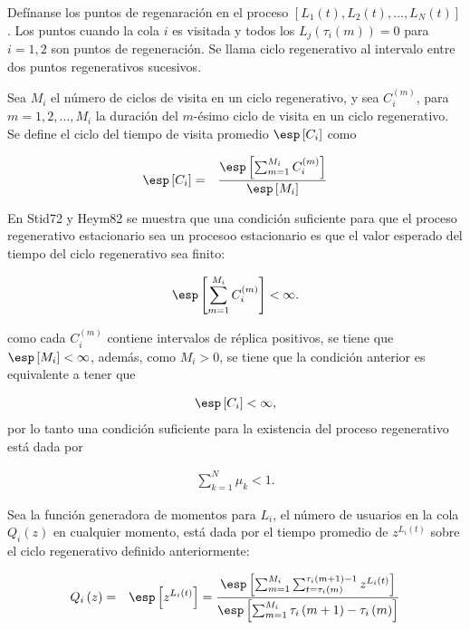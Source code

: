 Def\'inanse los puntos de regenaraci\'on  en el proceso $\left[L_{1}\left(t\right),L_{2}\left(t\right),\ldots,L_{N}\left(t\right)\right]$. Los puntos cuando la cola $i$ es visitada y todos los $L_{j}\left(\tau_{i}\left(m\right)\right)=0$ para $i=1,2$  son puntos de regeneraci\'on. Se llama ciclo regenerativo al intervalo entre dos puntos regenerativos sucesivos.

Sea $M_{i}$  el n\'umero de ciclos de visita en un ciclo regenerativo, y sea $C_{i}^{(m)}$, para $m=1,2,\ldots,M_{i}$ la duraci\'on del $m$-\'esimo ciclo de visita en un ciclo regenerativo. Se define el ciclo del tiempo de visita promedio $\esp\left[C_{i}\right]$ como

\begin{eqnarray*}
\esp\left[C_{i}\right]&=&\frac{\esp\left[\sum_{m=1}^{M_{i}}C_{i}^{(m)}\right]}{\esp\left[M_{i}\right]}
\end{eqnarray*}


En Stid72 y Heym82 se muestra que una condici\'on suficiente para que el proceso regenerativo 
estacionario sea un procesoo estacionario es que el valor esperado del tiempo del ciclo regenerativo sea finito:

\begin{eqnarray*}
\esp\left[\sum_{m=1}^{M_{i}}C_{i}^{(m)}\right]<\infty.
\end{eqnarray*}

como cada $C_{i}^{(m)}$ contiene intervalos de r\'eplica positivos, se tiene que $\esp\left[M_{i}\right]<\infty$, adem\'as, como $M_{i}>0$, se tiene que la condici\'on anterior es equivalente a tener que 

\begin{eqnarray*}
\esp\left[C_{i}\right]<\infty,
\end{eqnarray*}
por lo tanto una condici\'on suficiente para la existencia del proceso regenerativo est\'a dada por

\begin{eqnarray*}
\sum_{k=1}^{N}\mu_{k}<1.
\end{eqnarray*}

Sea la funci\'on generadora de momentos para $L_{i}$, el n\'umero de usuarios en la cola $Q_{i}\left(z\right)$ en cualquier momento, est\'a dada por el tiempo promedio de $z^{L_{i}\left(t\right)}$ sobre el ciclo regenerativo definido anteriormente:

\begin{eqnarray*}
Q_{i}\left(z\right)&=&\esp\left[z^{L_{i}\left(t\right)}\right]=\frac{\esp\left[\sum_{m=1}^{M_{i}}\sum_{t=\tau_{i}\left(m\right)}^{\tau_{i}\left(m+1\right)-1}z^{L_{i}\left(t\right)}\right]}{\esp\left[\sum_{m=1}^{M_{i}}\tau_{i}\left(m+1\right)-\tau_{i}\left(m\right)\right]}
\end{eqnarray*}

